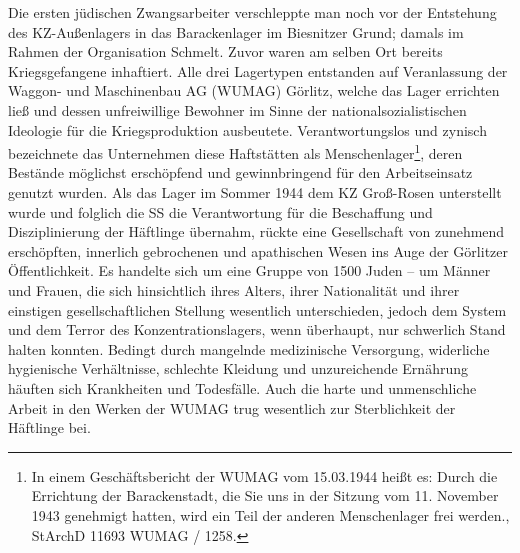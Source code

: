 
Die ersten jüdischen Zwangsarbeiter verschleppte man noch vor der Entstehung des KZ-Außen\-lagers in das Barackenlager im Biesnitzer Grund; damals im Rahmen der Organisation Schmelt. Zuvor waren am selben Ort bereits Kriegsgefangene inhaftiert. Alle drei Lagertypen entstanden auf Veranlassung der Waggon- und Maschinenbau AG (WUMAG) Görlitz, welche das Lager errichten ließ und dessen unfreiwillige Bewohner im Sinne der nationalsozialistischen Ideologie für die Kriegsproduktion ausbeutete. Verantwortungslos und zynisch bezeichnete das Unternehmen diese Haftstätten als \glqq Menschenlager\grqq\footnote{In einem Geschäftsbericht der WUMAG vom 15.03.1944 heißt es: \glqq Durch die Errichtung der Barackenstadt, die Sie uns in der Sitzung vom 11. November 1943 genehmigt hatten, wird ein Teil der anderen Menschenlager frei werden.\grqq, StArchD 11693 WUMAG / 1258.}, deren Bestände möglichst erschöpfend und gewinnbringend für den Arbeitseinsatz genutzt wurden. \newline
Als das Lager im Sommer 1944 dem KZ Groß-Rosen unterstellt wurde und folglich die SS die Verantwortung für die Beschaffung und Disziplinierung der Häftlinge übernahm, rückte eine Gesellschaft von zunehmend erschöpften, innerlich gebrochenen und apathischen Wesen ins Auge der Görlitzer Öffentlichkeit. Es handelte sich um eine Gruppe von 1500 Juden -- um Männer und Frauen, die sich hinsichtlich ihres Alters, ihrer Nationalität und ihrer einstigen gesellschaftlichen Stellung wesentlich unterschieden, jedoch dem System und dem Terror des Konzentrationslagers, wenn überhaupt, nur schwerlich Stand halten konnten. Bedingt durch mangelnde medizinische Versorgung, widerliche hygienische Verhältnisse, schlechte Kleidung und unzureichende Ernährung häuften sich Krankheiten und Todesfälle. Auch die harte und unmenschliche Arbeit in den Werken der WUMAG trug wesentlich zur Sterblichkeit der Häftlinge bei.
\\
